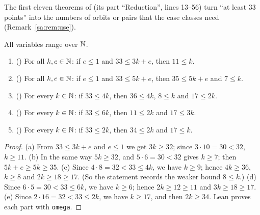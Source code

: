 The first eleven theorems of  (its part ``Reduction'', lines 13--56) turn ``at least $33$
points'' into the numbers of orbits or pairs that the case classes need (Remark~\ref{sa:rem:use}).

\begin{proposition}\label{sa:prop:rot}
All variables range over $\mathbb N$.
\begin{enumerate}[label=(\alph*)]
\item \textup{(}\textup{)} For all $k,e\in\mathbb N$: if $e\le1$ and $33\le3k+e$, then $11\le k$.
\item \textup{(}\textup{)} For all $k,e\in\mathbb N$: if $e\le1$ and $33\le5k+e$, then $35\le5k+e$ and
  $7\le k$.
\item \textup{(}\textup{)} For every $k\in\mathbb N$: if $33\le4k$, then $36\le4k$, $8\le k$ and
  $17\le2k$.
\item \textup{(}\textup{)} For every $k\in\mathbb N$: if $33\le6k$, then $11\le2k$ and $17\le3k$.
\item \textup{(}\textup{)} For every $k\in\mathbb N$: if $33\le2k$, then $34\le2k$ and $17\le k$.
\end{enumerate}
\end{proposition}

\begin{proof}
(a) From $33\le3k+e$ and $e\le1$ we get $3k\ge32$; since $3\cdot10=30<32$, $k\ge11$.
(b) In the same way $5k\ge32$, and $5\cdot6=30<32$ gives $k\ge7$; then $5k+e\ge5k\ge35$.
(c) Since $4\cdot8=32<33\le4k$, we have $k\ge9$; hence $4k\ge36$, $k\ge8$ and $2k\ge18\ge17$. (So the statement records
the weaker bound $8\le k$.)
(d) Since $6\cdot5=30<33\le6k$, we have $k\ge6$; hence $2k\ge12\ge11$ and $3k\ge18\ge17$.
(e) Since $2\cdot16=32<33\le2k$, we have $k\ge17$, and then $2k\ge34$.
Lean proves each part with \texttt{omega}.
\end{proof}

